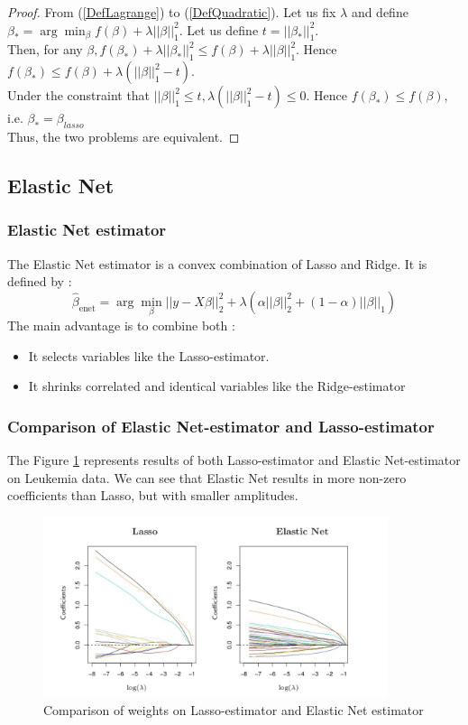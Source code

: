 \documentclass[a4paper,12pt]{article}
\begin{document}
\begin{proof}
From (\ref{DefLagrange}) to (\ref{DefQuadratic}). Let us fix $\lambda$ and define $\beta_*  = \arg \min_\beta f(\beta) + \lambda ||\beta||_1^2$. Let us define $t = ||\beta_*||_1^2.$\\ 
Then, for any $\beta, f(\beta_*)+ \lambda ||\beta_*||_1^2 \leq f(\beta)+\lambda||\beta||_1^2$. Hence $f(\beta_*)\leq f(\beta)+\lambda(||\beta||_1^2 - t).$\\
Under the constraint that $||\beta||_1^2 \leq t, \lambda(||\beta||_1^2 - t) \leq 0$. Hence $f(\beta_*) \leq f(\beta)$, i.e. $\beta_* = \beta_{lasso}$\\

Thus, the two problems are equivalent.
\end{proof}

\subsection{Elastic Net}
\subsubsection{Elastic Net estimator}
The Elastic Net estimator is a convex combination of Lasso and Ridge. It is defined by :
\[ \hat{\beta}_\text{enet} = \arg \min_\beta ||y - X\beta||_2^2 + \lambda(\alpha||\beta||_2^2 + (1 - \alpha)||\beta||_1) \]
The main advantage is to combine both :
\begin{itemize}
\item It selects variables like the Lasso-estimator. 
\item It shrinks correlated and identical variables like the Ridge-estimator
\end{itemize}

\subsubsection{Comparison of Elastic Net-estimator and Lasso-estimator}
The Figure \ref{Lassoenet} represents results of both Lasso-estimator and Elastic Net-estimator on Leukemia data. We can see that Elastic Net results in more non-zero coefficients than Lasso, but with smaller amplitudes.

\begin{figure}[!h]
\centerline{
\includegraphics[width = 0.9\textwidth]{figures/lassoenet.png}}
\caption{Comparison of weights on Lasso-estimator and Elastic Net estimator}
\label{Lassoenet}
\end{figure}
\end{document}
